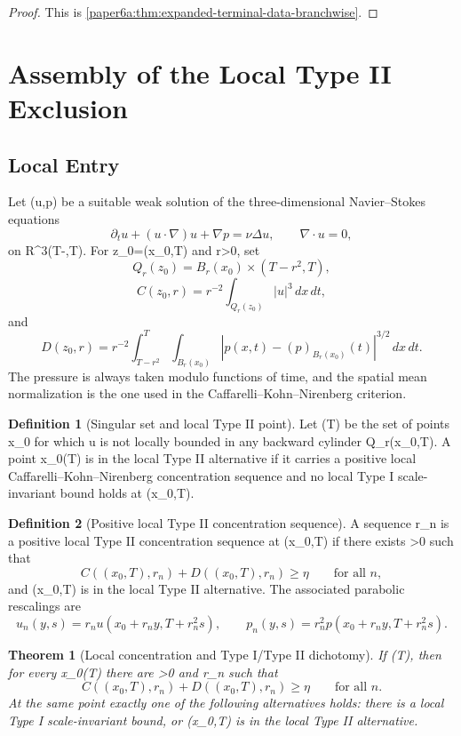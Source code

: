 \documentclass[11pt]{amsart}
\def\({}%
\def\){}%
\def\mathbb#1{#1}%
\theoremstyle{plain}
\newtheorem{theorem}{Theorem}[section]
\theoremstyle{definition}
\newtheorem{definition}[definition]{Definition}
\theoremstyle{remark}
\begin{document}
\begin{proof}
This is \cref{paper6a:thm:expanded-terminal-data-branchwise}.
\end{proof}

\clearpage
\section{Assembly of the Local Type II Exclusion}\label{sec:typeII-assembly}
\subsection{Local Entry}

Let \((u,p)\) be a suitable weak solution of the three-dimensional
Navier--Stokes equations
\[
  \partial_tu+(u\cdot\nabla)u+\nabla p=\nu\Delta u,
  \qquad \nabla\cdot u=0,
\]
on \(\mathbb R^3\times(T-\delta,T)\).  For \(z_0=(x_0,T)\) and \(r>0\), set
\[
  Q_r(z_0)=B_r(x_0)\times(T-r^2,T),
\]
\[
  C(z_0,r)=r^{-2}\int_{Q_r(z_0)}|u|^3\,dx\,dt,
\]
and
\[
  D(z_0,r)=r^{-2}\int_{T-r^2}^{T}\int_{B_r(x_0)}
  |p(x,t)-(p)_{B_r(x_0)}(t)|^{3/2}\,dx\,dt.
\]
The pressure is always taken modulo functions of time, and the spatial mean
normalization is the one used in the Caffarelli--Kohn--Nirenberg criterion.

\begin{definition}[Singular set and local Type II point]
Let \(\Sigma(T)\) be the set of points \(x_0\) for which \(u\) is not locally
bounded in any backward cylinder \(Q_r(x_0,T)\).  A point \(x_0\in\Sigma(T)\)
is in the local Type II alternative if it carries a positive local
Caffarelli--Kohn--Nirenberg concentration sequence and no local Type I
scale-invariant bound holds at \((x_0,T)\).
\end{definition}

\begin{definition}[Positive local Type II concentration sequence]
\label{paper6:def:local-typeII-sequence}
A sequence \(r_n\) is a positive local Type II concentration sequence
at \((x_0,T)\) if there exists \(\eta>0\) such that
\[
  C((x_0,T),r_n)+D((x_0,T),r_n)\ge \eta
  \qquad\text{for all }n,
\]
and \((x_0,T)\) is in the local Type II alternative.  The associated parabolic
rescalings are
\[
  u_n(y,s)=r_nu(x_0+r_ny,T+r_n^2s),
  \qquad
  p_n(y,s)=r_n^2p(x_0+r_ny,T+r_n^2s).
\]
\end{definition}

\begin{theorem}[Local concentration and Type I/Type II dichotomy]
\label{paper6:thm:paper0}
If \(\Sigma(T)\ne\emptyset\), then for every \(x_0\in\Sigma(T)\) there are
\(\eta>0\) and \(r_n\) such that
\[
  C((x_0,T),r_n)+D((x_0,T),r_n)\ge\eta
  \qquad\text{for all }n.
\]
At the same point exactly one of the following alternatives holds: there is a
local Type I scale-invariant bound, or \((x_0,T)\) is in the local Type II
alternative.
\end{theorem}
\end{document}
